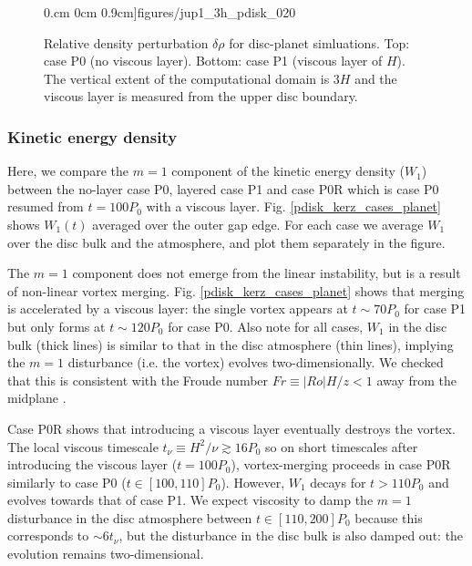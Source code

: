 \begin{figure}
    0.cm 0cm 0.9cm]{figures/jup1_3h_pdisk_020}\\
  \caption{Relative density perturbation $\delta\rho$ for disc-planet
    simluations. Top: case P0 (no viscous layer). Bottom: case P1 (viscous layer of $H$). The
    vertical extent of the computational domain is $3H$ and the
    viscous layer is measured from the upper disc boundary.  
    \label{jup0_3h}}
\end{figure}

\subsubsection{Kinetic energy density}%
Here, we compare the $m=1$ component of the kinetic energy density
($W_1$)  between the no-layer case P0, layered
case P1 and case P0R which is case P0 resumed from $t=100P_0$ with a
viscous layer. Fig. \ref{pdisk_kerz_cases_planet} shows 
$W_1(t)$ averaged over the outer gap edge. For each case we
average $W_1$ over the disc bulk and the atmosphere, and plot them
separately in the figure. 

The $m=1$ component does not emerge from the linear instability, but is a
result of non-linear vortex merging. 
Fig. \ref{pdisk_kerz_cases_planet} shows that merging is accelerated
by a viscous layer: the single vortex appears at $t\sim70P_0$ for case
P1 but only forms at $t\sim120P_0$ for case P0. Also note for all
cases, $W_1$ in the disc bulk (thick lines) is similar to that in the
disc atmosphere (thin lines), implying the $m=1$ disturbance
(i.e. the vortex) evolves two-dimensionally. We checked that this is
consistent with the Froude number $Fr\equiv|Ro|H/z < 1 $ away from the
midplane \citep{barranco05,oishi09}. 


Case P0R shows that introducing a viscous layer eventually destroys
the vortex. The local viscous timescale $t_\nu\equiv
H^2/\nu\gtrsim 16P_0$ so on short timescales after introducing the 
viscous layer ($t=100P_0$), vortex-merging proceeds in case P0R
similarly to case P0 ($t\in[100,110]P_0$). However, $W_1$ decays for
$t>110P_0$ and evolves towards that of case P1. We expect viscosity
to damp the $m=1$ disturbance in the disc atmosphere between
$t\in[110,200]P_0$ because this corresponds to $\sim 6 t_\nu$, but 
the disturbance in the disc bulk is also damped out: the evolution
remains two-dimensional.    

